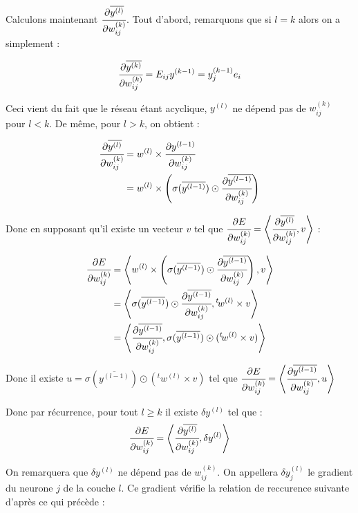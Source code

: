 Calculons maintenant $\cfrac{\partial \overline{y^{(l)}}}{\partial w_{ij}^{(k)}}$.
Tout d'abord, remarquons que si $l = k$ alors on a simplement :

\[\cfrac{\partial \overline{y^{(k)}}}{\partial w_{ij}^{(k)}} = E_{ij} y^{(k-1)} = y^{(k-1)}_j e_i\]

Ceci vient du fait que le réseau étant acyclique, $ y^{(l)}$ ne dépend pas de
$w_{ij}^{(k)}$ pour $l < k$. De même, pour $l > k$, on obtient :

\begin{align*}
\cfrac{\partial \overline{y^{(l)}}}{\partial w_{ij}^{(k)}} &= w^{(l)} \times \cfrac{\partial y^{(l-1)}}{\partial w_{ij}^{(k)}}\\
&= w^{(l)} \times \left(\sigma(\overline{y^{(l-1)}}) \odot \cfrac{\partial \overline{y^{(l-1)}}}{\partial w_{ij}^{(k)}}\right)
\end{align*}

Donc en supposant qu'il existe un vecteur $v$ tel que $\cfrac{\partial E}{\partial w_{ij}^{(k)}} = \left\langle\cfrac{\partial \overline{y^{(l)}}}{\partial w_{ij}^{(k)}} ,v\right\rangle$ :

\begin{align*}
\cfrac{\partial E}{\partial w_{ij}^{(k)}} &= \left\langle w^{(l)} \times \left(\sigma(\overline{y^{(l-1)}}) \odot \cfrac{\partial \overline{y^{(l-1)}}}{\partial w_{ij}^{(k)}}\right) ,v\right\rangle\\
&= \left\langle\sigma(\overline{y^{(l-1)}}) \odot \cfrac{\partial \overline{y^{(l-1)}}}{\partial w_{ij}^{(k)}},{}^t \! w^{(l)} \times v\right\rangle\\
&= \left\langle\cfrac{\partial \overline{y^{(l-1)}}}{\partial w_{ij}^{(k)}},\sigma(\overline{y^{(l-1)}}) \odot ({}^t \! w^{(l)} \times v)\right\rangle\\
\end{align*}

Donc il existe $u = \sigma(\overline{y^{(l-1)}}) \odot ({}^t \! w^{(l)} \times v)$
tel que $\cfrac{\partial E}{\partial w_{ij}^{(k)}} = \left\langle\cfrac{\partial \overline{y^{(l-1)}}}{\partial w_{ij}^{(k)}} ,u\right\rangle$

Donc par récurrence, pour tout $l \geq k$ il existe $\delta y^{(l)}$ tel que :
\[\cfrac{\partial E}{\partial w_{ij}^{(k)}} = \left\langle\cfrac{\partial \overline{y^{(l)}}}{\partial w_{ij}^{(k)}} ,\delta y^{(l)}\right\rangle\]

On remarquera que $\delta y^{(l)}$ ne dépend pas de $w_{ij}^{(k)}$. On appellera
 $\delta y^{(l)}_j$ le gradient du neurone $j$ de la couche $l$. Ce gradient
 vérifie la relation de reccurence suivante d'après ce qui précède :

